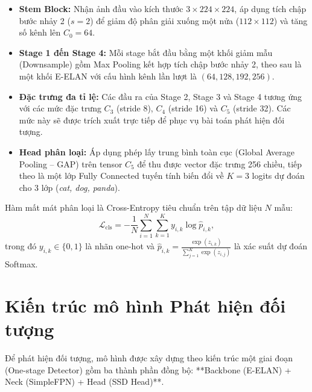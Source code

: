 \documentclass[fontsize=13pt,a4paper,oneside,DIV=calc,chapterprefix=true]{scrbook}
\begin{document}
\begin{itemize}[leftmargin=1.2cm]
    \item \textbf{Stem Block:} Nhận ảnh đầu vào kích thước $3 \times 224 \times 224$, áp dụng tích chập bước nhảy 2 ($s=2$) để giảm độ phân giải xuống một nửa ($112 \times 112$) và tăng số kênh lên $C_0 = 64$.
    \item \textbf{Stage 1 đến Stage 4:} Mỗi stage bắt đầu bằng một khối giảm mẫu (Downsample) gồm Max Pooling kết hợp tích chập bước nhảy 2, theo sau là một khối E-ELAN với cấu hình kênh lần lượt là $(64, 128, 192, 256)$.
    \item \textbf{Đặc trưng đa tỉ lệ:} Các đầu ra của Stage 2, Stage 3 và Stage 4 tương ứng với các mức đặc trưng $C_3$ (stride 8), $C_4$ (stride 16) và $C_5$ (stride 32). Các mức này sẽ được trích xuất trực tiếp để phục vụ bài toán phát hiện đối tượng.
    \item \textbf{Head phân loại:} Áp dụng phép lấy trung bình toàn cục (Global Average Pooling -- GAP) trên tensor $C_5$ để thu được vector đặc trưng 256 chiều, tiếp theo là một lớp Fully Connected tuyến tính biến đổi về $K=3$ logits dự đoán cho 3 lớp (\emph{cat, dog, panda}).
\end{itemize}

Hàm mất mát phân loại là Cross-Entropy tiêu chuẩn trên tập dữ liệu $N$ mẫu:
\begin{equation}
\mathcal{L}_{\mathrm{cls}} = -\frac{1}{N} \sum_{i=1}^N \sum_{k=1}^K y_{i, k} \log \hat{p}_{i, k},
\end{equation}
trong đó $y_{i, k} \in \{0, 1\}$ là nhãn one-hot và $\hat{p}_{i, k} = \frac{\exp(z_{i, k})}{\sum_{j=1}^K \exp(z_{i, j})}$ là xác suất dự đoán Softmax.

\section{Kiến trúc mô hình Phát hiện đối tượng}
Để phát hiện đối tượng, mô hình được xây dựng theo kiến trúc một giai đoạn (One-stage Detector) gồm ba thành phần đồng bộ: **Backbone (E-ELAN) + Neck (SimpleFPN) + Head (SSD Head)**.
\end{document}
